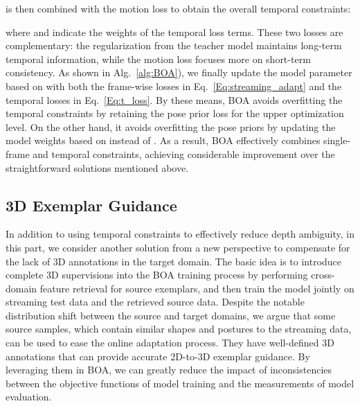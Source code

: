 \documentclass[10pt,journal,compsoc]{IEEEtran}
\newcommand{\eqn}[1]{Eq.~\eqref{#1}}
\newcommand{\alg}[1]{Alg.~\ref{#1}}
\begin{document}
 is then combined with the motion loss to obtain the overall temporal constraints:

where  and  indicate the weights of the temporal loss terms. 
These two losses are complementary: the regularization from the teacher model maintains long-term temporal information, while the motion loss focuses more on short-term consistency. 
As shown in \alg{alg:BOA}), we finally update the model parameter based on  with both the frame-wise losses in \eqn{Eq:streaming_adapt} and the temporal losses in \eqn{Eq:t_loss}. 
By these means, BOA avoids overfitting the temporal constraints by retaining the pose prior loss for the upper optimization level. 
On the other hand, it avoids overfitting the pose priors by updating the model weights based on  instead of .
As a result, BOA effectively combines single-frame and temporal constraints, achieving considerable improvement over the straightforward solutions mentioned above.




\subsection{3D Exemplar Guidance}
\label{sec:exemplar_guidance}



In addition to using temporal constraints to effectively reduce depth ambiguity, in this part, we consider another solution from a new perspective to compensate for the lack of 3D annotations in the target domain.
The basic idea is to introduce complete 3D supervisions into the BOA training process by performing cross-domain feature retrieval for source exemplars, and then train the model jointly on streaming test data and the retrieved source data. 
Despite the notable distribution shift between the source and target domains, we argue that some source samples, which contain similar shapes and postures to the streaming data, can be used to ease the online adaptation process. They have well-defined 3D annotations that can provide accurate 2D-to-3D exemplar guidance. By leveraging them in BOA, we can greatly reduce the impact of inconsistencies between the objective functions of model training and the measurements of model evaluation.
\end{document}
